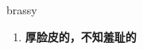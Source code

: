 
\begin{frame}
{\huge brassy}
\begin{center}
\begin{enumerate}\Large
  \item \textbf{厚脸皮的，不知羞耻的}
\end{enumerate}
\end{center}
\end{frame}
